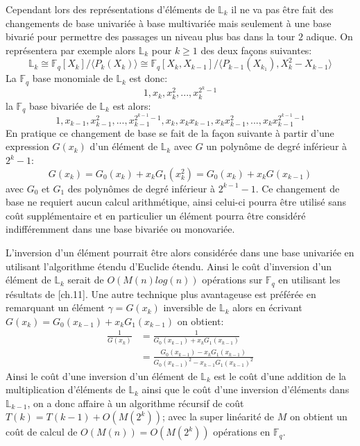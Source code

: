 \documentclass[10pt,a4paper]{book}
\theoremstyle{plain}
\theoremstyle{definition}
\theoremstyle{definition}
\theoremstyle{definition}
\theoremstyle{definition}
\theoremstyle{remark}
\theoremstyle{remark}
\begin{document}
Cependant lors des représentations d'éléments de $\mathbb{L}_k$ il ne va pas être fait des changements de base univariée à base multivariée mais seulement à une base bivarié pour permettre des passages un niveau plus bas dans la tour $2$ adique. On représentera par exemple alors $\mathbb{L}_k$ pour $k\geqslant1$ des deux façons suivantes:
\begin{equation*}
\mathbb{L}_k \cong \mathbb{F}_q[X_k]/\langle P_k(X_k) \rangle \cong \mathbb{F}_q[X_k,X_{k-1}]/\langle P_{k-1}(X_{k_1}), X_k^2-X_{k-1}  \rangle
\end{equation*}  
La $\mathbb{F}_q$ base monomiale de $\mathbb{L}_k$ est donc:
\begin{equation*}
1,x_k,x_k^2,...,x_k^{2^k-1}
\end{equation*}
la $\mathbb{F}_q$ base bivariée de $\mathbb{L}_k$ est alors:
\begin{equation*}
1,x_{k-1},x_{k-1}^2,...,x_{k-1}^{2^{k-1}-1},x_k,x_kx_{k-1},x_kx_{k-1}^2,...,x_kx_{k-1}^{2^{k-1}-1}
\end{equation*}
En pratique ce changement de base se fait de la façon suivante à partir d'une expression $G(x_k)$ d'un élément de $\mathbb{L}_k$ avec $G$ un polynôme de degré inférieur à $2^k-1$:
\begin{equation*}
G(x_k)=G_0(x_k)+x_kG_1(x_k^2)=G_0(x_k)+x_kG(x_{k-1})
\end{equation*}
avec $G_0$ et $G_1$ des polynômes de degré inférieur à $2^{k-1}-1$. Ce changement de base ne requiert aucun calcul arithmétique, ainsi celui-ci pourra être utilisé sans coût supplémentaire et en particulier un élément pourra être considéré indifféremment dans une base bivariée ou monovariée.%

L'inversion d'un élément pourrait être alors considérée dans une base univariée en utilisant l'algorithme étendu d'Euclide étendu. Ainsi le coût d'inversion d'un élément de $\mathbb{L}_k$ serait de $O(M(n)log(n))$ opérations sur $\mathbb{F}_q$ en utilisant les résultats de \cite{vzGJG03}[ch.11]. Une autre technique plus avantageuse est préférée en remarquant un élément $\gamma=G(x_k)$ inversible de $\mathbb{L}_k$ alors en écrivant $G(x_k)=G_0(x_{k-1})+x_kG_1(x_{k-1})$ on obtient:
\begin{align*}
\frac{1}{G(x_k)} &=\frac{1}{G_0(x_{k-1})+x_kG_1(x_{k-1})} \\
 				&= \frac{G_0(x_{k-1})-x_kG_1(x_{k-1})}{G_0(x_{k-1})^2-x_{k-1}G_1(x_{k-1})^2}
\end{align*}
Ainsi le coût d'une inversion d'un élément de $\mathbb{L}_k$ est le coût d'une addition de la multiplication d'éléments de $\mathbb{L}_k$ ainsi que le coût d'une inversion d'éléments dans $\mathbb{L}_{k-1}$, on a donc affaire à un algorithme récursif de coût  $T(k)=T(k-1)+O(M(2^k))$; avec la super linéarité de $M$ on obtient un coût de calcul de $O(M(n))=O(M(2^k))$ opérations en $\mathbb{F}_q$.
\end{document}
